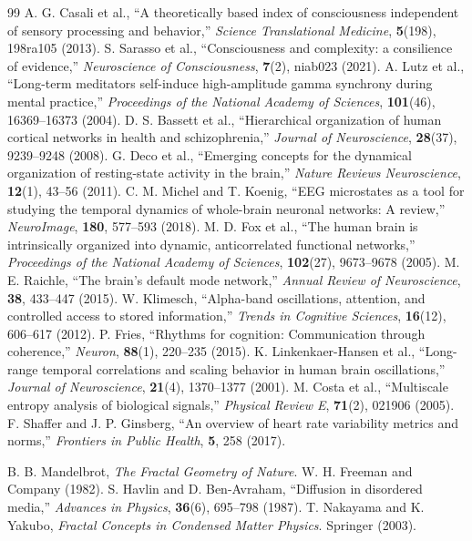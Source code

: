 \documentclass[12pt,a4paper]{article}
\begin{document}
\begin{thebibliography}{99}
		 A. G. Casali et al., ``A theoretically based index of consciousness independent of sensory processing and behavior,'' \emph{Science Translational Medicine}, \textbf{5}(198), 198ra105 (2013).
		 S. Sarasso et al., ``Consciousness and complexity: a consilience of evidence,'' \emph{Neuroscience of Consciousness}, \textbf{7}(2), niab023 (2021).
		 A. Lutz et al., ``Long-term meditators self-induce high-amplitude gamma synchrony during mental practice,'' \emph{Proceedings of the National Academy of Sciences}, \textbf{101}(46), 16369--16373 (2004).
		 D. S. Bassett et al., ``Hierarchical organization of human cortical networks in health and schizophrenia,'' \emph{Journal of Neuroscience}, \textbf{28}(37), 9239--9248 (2008).
		 G. Deco et al., ``Emerging concepts for the dynamical organization of resting-state activity in the brain,'' \emph{Nature Reviews Neuroscience}, \textbf{12}(1), 43--56 (2011).
		 C. M. Michel and T. Koenig, ``EEG microstates as a tool for studying the temporal dynamics of whole-brain neuronal networks: A review,'' \emph{NeuroImage}, \textbf{180}, 577--593 (2018).
		 M. D. Fox et al., ``The human brain is intrinsically organized into dynamic, anticorrelated functional networks,'' \emph{Proceedings of the National Academy of Sciences}, \textbf{102}(27), 9673--9678 (2005).
		 M. E. Raichle, ``The brain's default mode network,'' \emph{Annual Review of Neuroscience}, \textbf{38}, 433--447 (2015).
		 W. Klimesch, ``Alpha-band oscillations, attention, and controlled access to stored information,'' \emph{Trends in Cognitive Sciences}, \textbf{16}(12), 606--617 (2012).
		 P. Fries, ``Rhythms for cognition: Communication through coherence,'' \emph{Neuron}, \textbf{88}(1), 220--235 (2015).
		 K. Linkenkaer-Hansen et al., ``Long-range temporal correlations and scaling behavior in human brain oscillations,'' \emph{Journal of Neuroscience}, \textbf{21}(4), 1370--1377 (2001).
		 M. Costa et al., ``Multiscale entropy analysis of biological signals,'' \emph{Physical Review E}, \textbf{71}(2), 021906 (2005).
		 F. Shaffer and J. P. Ginsberg, ``An overview of heart rate variability metrics and norms,'' \emph{Frontiers in Public Health}, \textbf{5}, 258 (2017).
		
		 B. B. Mandelbrot, \emph{The Fractal Geometry of Nature}. W. H. Freeman and Company (1982).
		 S. Havlin and D. Ben-Avraham, ``Diffusion in disordered media,'' \emph{Advances in Physics}, \textbf{36}(6), 695--798 (1987).
		 T. Nakayama and K. Yakubo, \emph{Fractal Concepts in Condensed Matter Physics}. Springer (2003).
		

\end{thebibliography}
\end{document}
